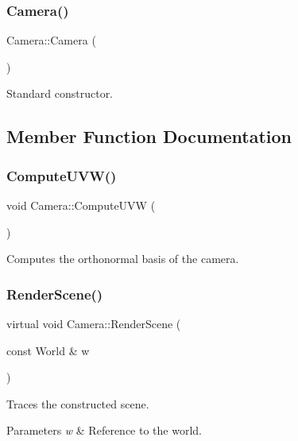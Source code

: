 \subsubsection{\texorpdfstring{Camera()}{Camera()}}
{\footnotesize\ttfamily Camera\+::\+Camera (\begin{DoxyParamCaption}{ }\end{DoxyParamCaption})}

Standard constructor. 

\subsection{Member Function Documentation}
\hypertarget{class_camera_ab2a27d88b13f4cab92d62bc421650e7b}{}\label{class_camera_ab2a27d88b13f4cab92d62bc421650e7b} 
\subsubsection{\texorpdfstring{Compute\+U\+V\+W()}{ComputeUVW()}}
{\footnotesize\ttfamily void Camera\+::\+Compute\+U\+VW (\begin{DoxyParamCaption}{ }\end{DoxyParamCaption})\hspace{0.3cm}{\ttfamily [protected]}}

Computes the orthonormal basis of the camera. \hypertarget{class_camera_ad65367e9b225387219d013ffed3f621a}{}\label{class_camera_ad65367e9b225387219d013ffed3f621a} 
\subsubsection{\texorpdfstring{Render\+Scene()}{RenderScene()}}
{\footnotesize\ttfamily virtual void Camera\+::\+Render\+Scene (\begin{DoxyParamCaption}\item[{const World \&}]{w }\end{DoxyParamCaption})\hspace{0.3cm}{\ttfamily [pure virtual]}}

Traces the constructed scene. 
\begin{DoxyParams}{Parameters}
{\em w} & Reference to the world. \\
\hline
\end{DoxyParams}


